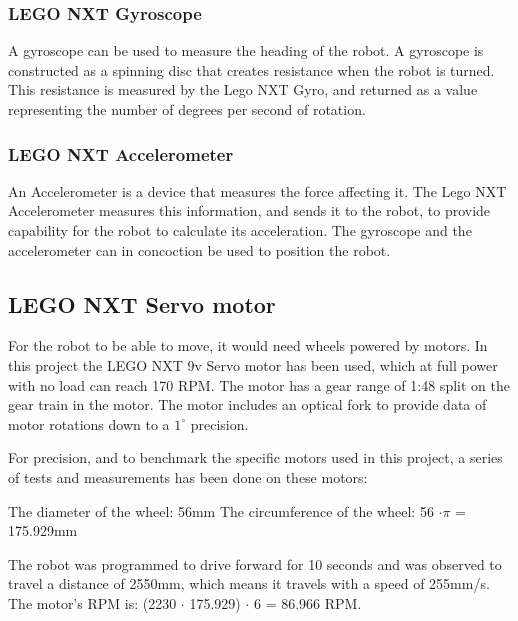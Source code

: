 \subsubsection{LEGO NXT Gyroscope}
\label{sec:LEGO NXT Gyroscope}
A gyroscope can be used to measure the heading of the robot. A gyroscope is constructed as a spinning disc that creates resistance when the robot is turned. This resistance is measured by the Lego NXT Gyro, and returned as a value representing the number of degrees per second of rotation. 

\subsubsection{LEGO NXT Accelerometer}
\label{sec:LEGO NXT Accelerometer}
An Accelerometer is a device that measures the force affecting it. The Lego NXT Accelerometer measures this information, and sends it to the robot, to provide capability for the robot to calculate its acceleration. The gyroscope and the accelerometer can in concoction be used to position the robot.

\subsection{LEGO NXT Servo motor}
\label{sec:LEGO NXT Servo motor}
For the robot to be able to move, it would need wheels powered by motors. In this project the LEGO NXT 9v Servo motor has been used, which at full power with no load can reach 170 RPM. The motor has a gear range of 1:48 split on the gear train in the motor. \citep{Servo} The motor includes an optical fork to provide data of motor rotations down to a \(1^{\circ}\) precision.

For precision, and to benchmark the specific motors used in this project, a series of tests and measurements has been done on these motors:

The diameter of the wheel: 56mm \newline
The circumference of the wheel: 56 \begin{math}\cdot \pi \end{math} = 175.929mm

The robot was programmed to drive forward for 10 seconds and was observed to travel a distance of 2550mm, which means it travels with a speed of 255mm/s. \newline
The motor’s RPM is: (2230 \begin{math} \cdot \end{math} 175.929) \begin{math} \cdot \end{math} 6 = 86.966 RPM.

